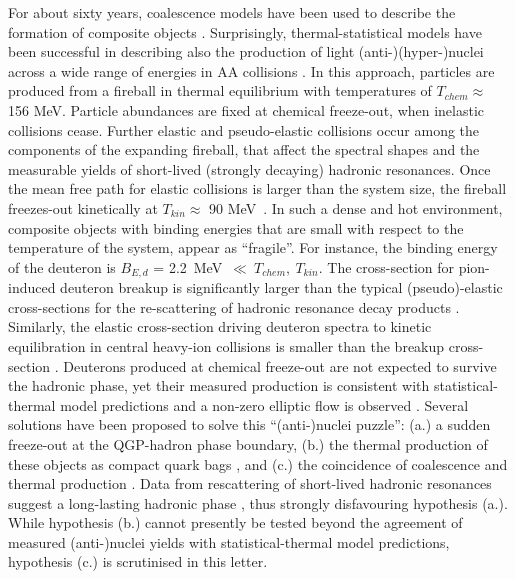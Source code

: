 For about sixty years, coalescence models have been used to describe the formation of composite objects \cite{Butler:1963, Kapusta:1980, Sato:1981ez, Nagle:1996vp, Scheibl:1998tk, Cho:2017dcy, Blum:2017qnn, Bazak:2018hgl, Zhao:2018lyf}.
Surprisingly, thermal-statistical models have been successful in describing also the production of light \mbox{(anti-)}(hyper-)nuclei across a wide range of energies in AA collisions \cite{Andronic:2010qu,Andronic:2017}. 
In this approach, particles are produced from a fireball in thermal equilibrium with temperatures of $T_{chem} \approx$ 156 MeV.
Particle abundances are fixed at chemical freeze-out, when inelastic collisions cease. Further elastic and pseudo-elastic collisions occur among the components of the expanding fireball, that affect the spectral shapes and the measurable yields of short-lived (strongly decaying) hadronic resonances. Once the mean free path for elastic collisions is larger than the system size, the fireball freezes-out kinetically at $T_{kin} \approx$ 90 MeV~\cite{Abelev:2013vea}. 
In such a dense and hot environment, composite objects with binding energies that are small with respect to the temperature of the system, appear as ``fragile''. 
For instance, the binding energy of the deuteron is $B_{E, d}$ = 2.2~MeV~$\ll~T_{chem},~T_{kin}$.
The cross-section for pion-induced deuteron breakup is significantly larger than the typical (pseudo)-elastic cross-sections for the re-scattering of hadronic resonance decay products \cite{Garcilazo:1982yc, Bass:1998ca, Schukraft:2017nbn}. 
Similarly, the elastic cross-section driving deuteron spectra to kinetic equilibration in central heavy-ion collisions \cite{Acharya:2017dmc} is smaller than the breakup cross-section \cite{Garcilazo:1982yc, Bass:1998ca, Schukraft:2017nbn}.   
Deuterons produced at chemical freeze-out are not expected to survive the hadronic phase, yet their measured production is consistent with statistical-thermal model predictions and a non-zero elliptic flow is observed \cite{Acharya:2017dmc}. 
Several solutions have been proposed to solve this ``(anti-)nuclei puzzle'': (a.) a sudden freeze-out at the QGP-hadron phase boundary, (b.) the thermal production of these objects as compact quark bags \cite{Andronic:2017}, and (c.) the coincidence of coalescence and thermal production \cite{Scheibl:1998tk, HeinzTorino}. 
Data from rescattering of short-lived hadronic resonances suggest a long-lasting hadronic phase \cite{Abelev:2014uua}, thus strongly disfavouring hypothesis (a.). 
While hypothesis (b.) cannot presently be tested beyond the agreement of measured (anti-)nuclei yields with statistical-thermal model predictions, hypothesis (c.) is scrutinised in this letter.
